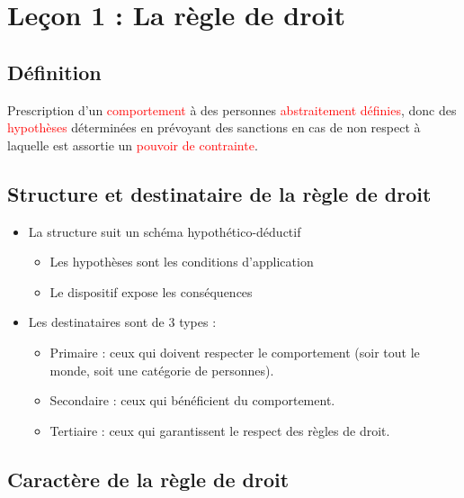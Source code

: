\chapter{Leçon 1 : La règle de droit}

\section{Définition}

Prescription d'un \textcolor{red}{comportement} à des personnes \textcolor{red}{abstraitement définies}, donc des \textcolor{red}{hypothèses} déterminées en prévoyant des sanctions en cas de non respect à laquelle est assortie un \textcolor{red}{pouvoir de contrainte}.

\section{Structure et destinataire de la règle de droit}

\begin{itemize}
    \item La structure suit un schéma hypothético-déductif
    \begin{itemize}
        \item Les hypothèses sont les conditions d'application
        \item Le dispositif expose les conséquences
    \end{itemize}
    \item Les destinataires sont de 3 types :
        \begin{itemize}
            \item Primaire : ceux qui doivent respecter le comportement (soir tout le monde, soit une catégorie de personnes).
            \item Secondaire : ceux qui bénéficient du comportement.
            \item Tertiaire : ceux qui garantissent le respect des règles de droit.
        \end{itemize}
\end{itemize}

\section{Caractère de la règle de droit}

